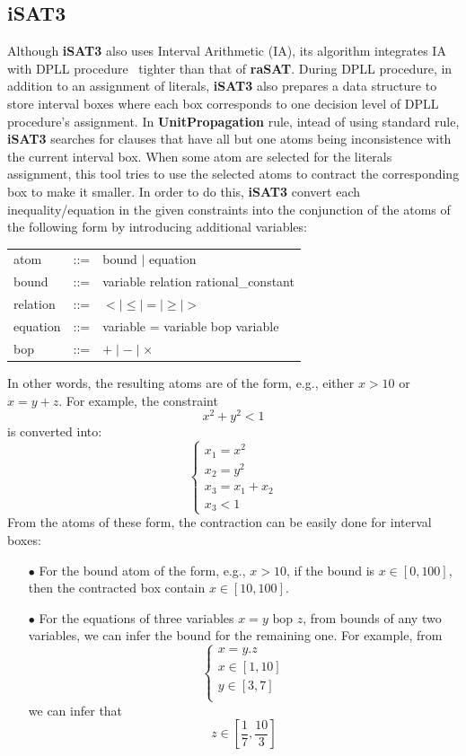 \documentclass[runningheads,a4paper,oribibl]{llncs}
\begin{document}
\subsection*{iSAT3}
Although \textbf{iSAT3} also uses Interval Arithmetic (IA), its algorithm integrates IA with DPLL procedure~\cite{dpll} tighter than that of \textbf{raSAT}. During DPLL procedure, in addition to an assignment of literals, \textbf{iSAT3} also prepares a data structure to store interval boxes where each box corresponds to one decision level of DPLL procedure's assignment. In \textbf{UnitPropagation} rule, intead of using standard rule, \textbf{iSAT3} searches for clauses that have all but one atoms being inconsistence with the current interval box. When some atom are selected for the literals assignment, this tool tries to use the selected atoms to contract the corresponding box to make it smaller. In order to do this, \textbf{iSAT3} convert each inequality/equation in the given constraints into the conjunction of the atoms of the following form by introducing additional variables:
\begin{center}
\begin{tabular}{l c l}
atom &::=& bound $\mid$ equation \\
bound &::=& variable relation rational\_constant \\
relation &::=& $< \mid \le \mid = \mid \ge \mid >$ \\
equation &::=& variable = variable bop variable \\
bop &::=& $+ \mid - \mid \times$
\end{tabular}
\end{center}
In other words, the resulting atoms are of the form, e.g., either $x > 10$ or $x = y + z$. For example, the constraint \[x^2 + y^2 < 1\]
is converted into:
\[\left\{ 
  \begin{array}{l}
    x_1 = x^2\\
    x_2 = y^2\\
    x_3 = x_1 + x_2\\
    x_3 < 1
   \end{array}
    \right.\]
From the atoms of these form, the contraction can be easily done for interval boxes:
\begin{itemize}
\item[$\bullet$] For the bound atom of the form, e.g., $x > 10$, if the bound is $x \in [0, 100]$, then the contracted box contain $x \in [10, 100]$.
\item[$\bullet$] For the equations of three variables $x = y \text{ bop } z$, from bounds of any two variables, we can infer the bound for the remaining one. For example, from
\[\left\{ 
  \begin{array}{l}
    x = y.z\\
    x \in [1, 10]\\
    y \in [3, 7]\\
   \end{array}
    \right.\]
we can infer that \[z \in [\frac{1}{7}, \frac{10}{3}] \]
\end{itemize}
\end{document}
